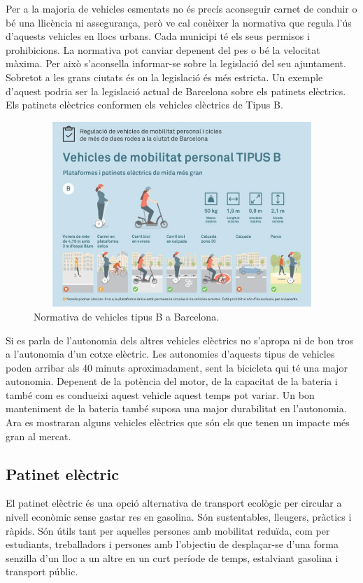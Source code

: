 Per a la majoria de vehicles esmentats no és precís aconseguir carnet de conduir o bé una llicència ni assegurança, però ve cal conèixer la normativa que regula l'ús d'aquests vehicles en llocs urbans. Cada municipi té els seus permisos i prohibicions. La normativa pot canviar depenent del pes o bé la velocitat màxima. Per això s'aconsella informar-se sobre la legislació del seu ajuntament. Sobretot a les grans ciutats és on la legislació és més estricta. Un exemple d'aquest podria ser la legislació actual de Barcelona sobre els patinets elèctrics. Els patinets elèctrics conformen els vehicles elèctrics de Tipus B.

\begin{figure}[H]
		\centering
    	\includegraphics[width=12cm, height=7cm]{Marcteoric/normativaBCNpatinetselectrics.jpg}
    	\caption{Normativa de vehicles tipus B a Barcelona.}
\end{figure}

Si es parla de l'autonomia dels altres vehicles elèctrics no s'apropa ni de bon tros a l'autonomia d'un cotxe elèctric. Les autonomies d'aquests tipus de vehicles poden arribar als 40 minuts aproximadament, sent la bicicleta qui té una major autonomia. Depenent de la potència del motor, de la capacitat de la bateria i també com es condueixi aquest vehicle aquest temps pot variar. Un bon manteniment de la bateria també suposa una major durabilitat en l'autonomia. Ara es mostraran alguns vehicles elèctrics que són els que tenen un impacte més gran al mercat.

\subsection{Patinet elèctric}
El patinet elèctric és una opció alternativa de transport ecològic per circular a nivell econòmic sense gastar res en gasolina. Són sustentables, lleugers, pràctics i ràpids. Són útils tant per aquelles persones amb mobilitat reduïda, com per estudiants, treballadors i persones amb l'objectiu de desplaçar-se d'una forma senzilla d'un lloc a un altre en un curt període de temps, estalviant gasolina i transport públic.

